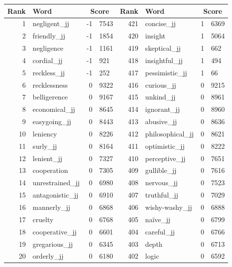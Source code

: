 \begin{table}[tbp]
    \begin{tabular}{| rlr@{.}l | rlr@{.}l |}
    \hline
    \textbf{Rank} & \textbf{Word} & \multicolumn{2}{c|}{\textbf{Score}} & \textbf{Rank} & \textbf{Word} & \multicolumn{2}{c|}{\textbf{Score}} \\
    \hline
    1 & negligent\_jj & -1 & 7543    &    421 & concise\_jj & 1 & 6369 \\
    2 & friendly\_jj & -1 & 1854    &    420 & insight & 1 & 5064 \\
    3 & negligence & -1 & 1161    &    419 & skeptical\_jj & 1 & 662 \\
    4 & cordial\_jj & -1 & 921    &    418 & insightful\_jj & 1 & 494 \\
    5 & reckless\_jj & -1 & 252    &    417 & pessimistic\_jj & 1 & 66 \\
    6 & recklessness & 0 & 9322    &    416 & curious\_jj & 0 & 9215 \\
    7 & belligerence & 0 & 9167    &    415 & unkind\_jj & 0 & 8961 \\
    8 & economical\_jj & 0 & 8645    &    414 & ignorant\_jj & 0 & 8960 \\
    9 & easygoing\_jj & 0 & 8443    &    413 & abusive\_jj & 0 & 8636 \\
    10 & leniency & 0 & 8226    &    412 & philosophical\_jj & 0 & 8621 \\
    11 & surly\_jj & 0 & 8164    &    411 & optimistic\_jj & 0 & 8222 \\
    12 & lenient\_jj & 0 & 7327    &    410 & perceptive\_jj & 0 & 7651 \\
    13 & cooperation & 0 & 7305    &    409 & gullible\_jj & 0 & 7616 \\
    14 & unrestrained\_jj & 0 & 6980    &    408 & nervous\_jj & 0 & 7523 \\
    15 & antagonistic\_jj & 0 & 6910    &    407 & truthful\_jj & 0 & 7029 \\
    16 & mannerly\_jj & 0 & 6868    &    406 & wishy-washy\_jj & 0 & 6888 \\
    17 & cruelty & 0 & 6768    &    405 & naïve\_jj & 0 & 6799 \\
    18 & cooperative\_jj & 0 & 6601    &    404 & careful\_jj & 0 & 6766 \\
    19 & gregarious\_jj & 0 & 6345    &    403 & depth & 0 & 6713 \\
    20 & orderly\_jj & 0 & 6180    &    402 & logic & 0 & 6592 \\

\end{tabular}
\end{table}
